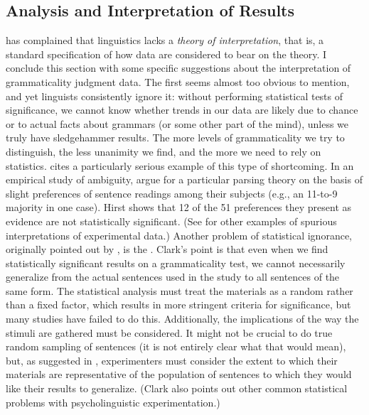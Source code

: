  \subsection{Analysis and Interpretation of Results}\label{sec:6.3.3}

 \citet{Levelt1974} has complained that linguistics lacks a \textit{theory of interpretation}, that is, a standard specification of how data are considered to bear on the theory. I conclude this section with some specific suggestions about the interpretation
 of grammaticality judgment data. The first seems almost too obvious to mention, and yet linguists consistently ignore it: without performing statistical tests of significance, we cannot know whether trends in our data are likely due to chance or to actual facts about grammars (or some other part of the mind), unless we truly have sledgehammer results. The more levels of grammaticality we try to distinguish, the less unanimity we find, and the more we need to rely on statistics. \citet[157, fn. 31]{Hirst1987} cites a particularly serious example of this type of shortcoming. In an empirical study of ambiguity,  \citet{FordEtAl1982} argue for a particular parsing theory on the basis of slight preferences of sentence readings among their subjects (e.g., an 11-to-9 majority in one case). Hirst shows that 12 of the 51 preferences they present as evidence are not statistically significant. (See \citet{Birdsong1989} for other examples of spurious interpretations of experimental data.) Another problem of statistical ignorance, originally pointed out by \citet{Clark1973}, is the . Clark's point is that even when we find statistically significant results on a grammaticality test, we cannot necessarily generalize from the actual sentences used in the study to all sentences of the same form. The statistical analysis must treat the materials as a random rather than a fixed factor, which results in more stringent criteria for significance, but many studies have failed to do this. Additionally, the implications of the way the stimuli are gathered must be considered. It might not be crucial to do true random sampling of sentences (it is not entirely clear what that would mean), but, as suggested in , experimenters must consider the extent to which their materials are representative of the population of sentences to which they would like their results to generalize. (Clark also points out other common statistical problems with psycholinguistic experimentation.)

